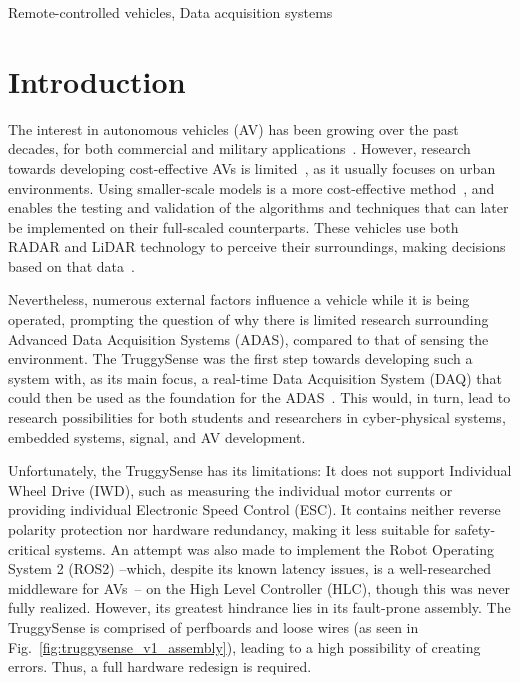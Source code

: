 \documentclass[conference,a4paper]{IEEEtran}
\let\oldsection\section
\renewcommand{\section}[1]{
  \setlength{\parskip}{0em}
  \setlength{\parindent}{0pt}
  \oldsection{#1}
}
\newcommand{\ParagraphSeperator}{
  \setlength{\parskip}{0em}
  \setlength{\parindent}{10pt}
}
\begin{document}
\ParagraphSeperator
\begin{keywords}
Remote-controlled vehicles, Data acquisition systems
\end{keywords}

\section{Introduction}
\ParagraphSeperator
The interest in autonomous vehicles (AV) has been growing over the past decades, for both commercial and military applications~\cite{Algahtani2019}.
However, research towards developing cost-effective AVs is limited~\cite{Brown2022, Baumann2024}, as it usually focuses on urban environments.
Using smaller-scale models is a more cost-effective method~\cite{Li2024}, and enables the testing and validation of the algorithms and techniques that can later be implemented on their full-scaled counterparts.
These vehicles use both RADAR and LiDAR technology to perceive their surroundings, making decisions based on that data~\cite{Loetscher2023}.

\ParagraphSeperator
Nevertheless, numerous external factors influence a vehicle while it is being operated, prompting the question of why there is limited research surrounding Advanced Data Acquisition Systems (ADAS), compared to that of sensing the environment.
The TruggySense was the first step towards developing such a system with, as its main focus, a real-time Data Acquisition System (DAQ) that could then be used as the foundation for the ADAS~\cite{Elsermans2025}.
This would, in turn, lead to research possibilities for both students and researchers in cyber-physical systems, embedded systems, signal, and AV development.

\setlength{\parskip}{0em}
\setlength{\parindent}{10pt}
Unfortunately, the TruggySense has its limitations:
It does not support Individual Wheel Drive (IWD), such as measuring the individual motor currents or providing individual Electronic Speed Control (ESC).
It contains neither reverse polarity protection nor hardware redundancy, making it less suitable for safety-critical systems.
An attempt was also made to implement the Robot Operating System 2 (ROS2) --which, despite its known latency issues, is a well-researched middleware for AVs~\cite{Horváth2024}-- on the High Level Controller (HLC), though this was never fully realized.
However, its greatest hindrance lies in its fault-prone assembly.
The TruggySense is comprised of perfboards and loose wires (as seen in Fig.~\ref{fig:truggysense_v1_assembly}), leading to a high possibility of creating errors.
Thus, a full hardware redesign is required. 
\end{document}
